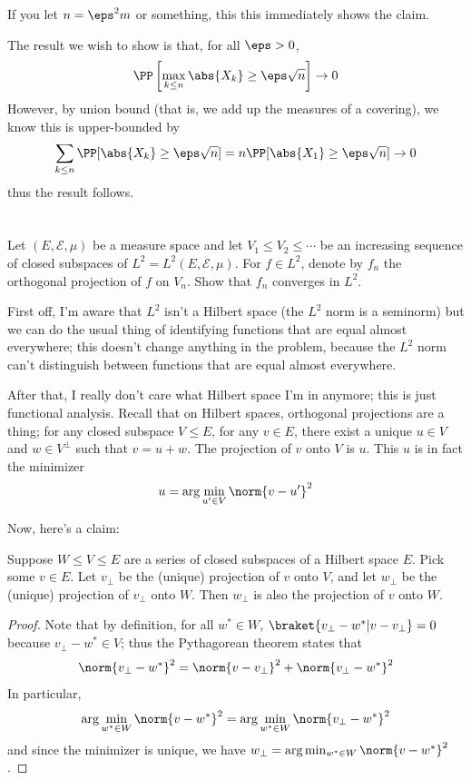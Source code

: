\documentclass[11pt, headheight=30pt]{scrartcl}
\begin{document}
If you let $n = \eps^2 m$ or something, this this
immediately shows the claim.

The result we wish to show is that, for all $\eps > 0$,
\[
    \PP\left[\max_{k \leq n} \abs{X_k} \geq \eps\sqrt{n}\right] \to 0
\]
However, by union bound (that is, we add up the measures of a covering),
we know this is upper-bounded by
\[
    \sum_{k\leq n} \PP[\abs{X_k} \geq \eps\sqrt{n}] = n\PP[\abs{X_1} \geq \eps\sqrt{n}] \to 0    
\]
thus the result follows.


\section{}
\begin{prob*}
    Let $(E, \mathscr{E}, \mu)$ be a measure space and let $V_1 \le V_2 \le \cdots$ be an
    increasing sequence of closed subspaces of $L^2 = L^2(E, \mathscr{E}, \mu)$. For
    $f \in L^2$, denote by $f_n$ the orthogonal projection of $f$ on $V_n$.
    Show that $f_n$ converges in $L^2$.
\end{prob*}

First off, I'm aware that $L^2$ isn't a Hilbert space (the $L^2$ norm is
a seminorm) but we can do the usual thing of identifying functions that are
equal almost everywhere; this doesn't change anything in the problem,
because the $L^2$ norm can't distinguish between functions that are equal
almost everywhere.

After that, I really don't care what Hilbert space I'm in anymore;
this is just functional analysis. Recall that on Hilbert
spaces, orthogonal projections are a thing; for any closed subspace $V\leq E$,
for any $v\in E$, there exist a unique $u \in V$ and $w \in V^\perp$
such that $v = u + w$. The projection of $v$ onto $V$ is $u$. This $u$
is in fact the minimizer
\[
    u = \arg\min_{u'\in V} \norm{v - u'}^2    
\]

Now, here's a claim:
\begin{claim*}
    Suppose $W\leq V \leq E$ are a series of closed subspaces of a Hilbert
    space $E$. Pick some $v\in E$. Let $v_\perp$ be the (unique)
    projection of $v$ onto $V$, and let $w_\perp$ be the (unique)
    projection of $v_\perp$ onto $W$. Then $w_\perp$ is also
    the projection of $v$ onto $W$.
\end{claim*}
\begin{proof}
    Note that by definition, for all $w^*\in W$,
    $\braket{v_\perp - w^* | v - v_\perp} = 0$
    because $v_\perp - w^*\in V$; thus the Pythagorean
    theorem states that
    \[
        \norm{v_\perp - w^*}^2 = \norm{v - v_\perp}^2 + \norm{v_\perp - w^*}^2
    \]
    In particular,
    \[
        \arg\min_{w^*\in W} \norm{v - w^*}^2 = \arg\min_{w^*\in W} \norm{v_\perp - w^*}^2
    \]
    and since the minimizer is unique, we have
    $w_\perp = \arg\min_{w^*\in W} \norm{v - w^*}^2$.
\end{proof}
\end{document}
